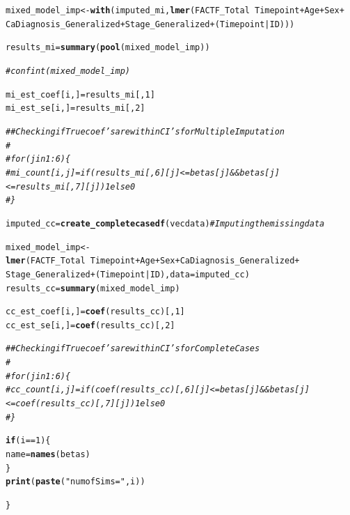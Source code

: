 \documentclass[fleqn,10pt]{wlscirep}\usepackage[]{graphicx}\usepackage[]{color}
\makeatletter
\newcommand{\hlnum}[1]{\textcolor[rgb]{0.686,0.059,0.569}{#1}}%
\newcommand{\hlstr}[1]{\textcolor[rgb]{0.192,0.494,0.8}{#1}}%
\newcommand{\hlcom}[1]{\textcolor[rgb]{0.678,0.584,0.686}{\textit{#1}}}%
\newcommand{\hlopt}[1]{\textcolor[rgb]{0,0,0}{#1}}%
\newcommand{\hlstd}[1]{\textcolor[rgb]{0.345,0.345,0.345}{#1}}%
\newcommand{\hlkwa}[1]{\textcolor[rgb]{0.161,0.373,0.58}{\textbf{#1}}}%
\newcommand{\hlkwb}[1]{\textcolor[rgb]{0.69,0.353,0.396}{#1}}%
\newcommand{\hlkwc}[1]{\textcolor[rgb]{0.333,0.667,0.333}{#1}}%
\newcommand{\hlkwd}[1]{\textcolor[rgb]{0.737,0.353,0.396}{\textbf{#1}}}%
\newenvironment{kframe}{%
 \def\at@end@of@kframe{}%
 \ifinner\ifhmode%
  \def\at@end@of@kframe{\end{minipage}}%
  \begin{minipage}{\columnwidth}%
 \fi\fi%
 \def\FrameCommand##1{\hskip\@totalleftmargin \hskip-\fboxsep
 \colorbox{shadecolor}{##1}\hskip-\fboxsep
     \hskip-\linewidth \hskip-\@totalleftmargin \hskip\columnwidth}%
 \MakeFramed {\advance\hsize-\width
   \@totalleftmargin\z@ \linewidth\hsize
   \@setminipage}}%
 {\par\unskip\endMakeFramed%
 \at@end@of@kframe}
\newenvironment{knitrout}{}{} %
\makeatother
\begin{document}
\begin{knitrout}
\begin{kframe}
\begin{alltt}
    \hlstd{mixed_model_imp} \hlkwb{<-} \hlkwd{with}\hlstd{(imputed_mi,}\hlkwd{lmer}\hlstd{(FACTF_Total} \hlopt{~} \hlstd{Timepoint} \hlopt{+} \hlstd{Age} \hlopt{+} \hlstd{Sex} \hlopt{+}
                            \hlstd{CaDiagnosis_Generalized} \hlopt{+} \hlstd{Stage_Generalized} \hlopt{+} \hlstd{(Timepoint}\hlopt{|}\hlstd{ID)))}

    \hlstd{results_mi} \hlkwb{=} \hlkwd{summary}\hlstd{(}\hlkwd{pool}\hlstd{(mixed_model_imp))}

    \hlcom{# confint(mixed_model_imp)}

    \hlstd{mi_est_coef[i,]} \hlkwb{=} \hlstd{results_mi[,} \hlnum{1} \hlstd{]}
    \hlstd{mi_est_se[i, ]} \hlkwb{=} \hlstd{results_mi[,} \hlnum{2} \hlstd{]}

\hlcom{#     # Checking if True coef's are within CI's for Multiple Imputation}
\hlcom{#     }
\hlcom{#     for (j in 1:6)\{}
\hlcom{#       mi_count[i,j] = if (results_mi[,6][j] <= betas[j] && betas[j] <= results_mi[, 7][j]) 1 else 0}
\hlcom{#     \}}

    \hlstd{imputed_cc} \hlkwb{=} \hlkwd{create_completecasedf}\hlstd{(vecdata)} \hlcom{# Imputing the missing data}

    \hlstd{mixed_model_imp} \hlkwb{<-} \hlkwd{lmer}\hlstd{(FACTF_Total} \hlopt{~} \hlstd{Timepoint} \hlopt{+} \hlstd{Age} \hlopt{+} \hlstd{Sex} \hlopt{+} \hlstd{CaDiagnosis_Generalized} \hlopt{+}
                              \hlstd{Stage_Generalized} \hlopt{+} \hlstd{(Timepoint}\hlopt{|}\hlstd{ID),} \hlkwc{data} \hlstd{= imputed_cc)}
    \hlstd{results_cc} \hlkwb{=} \hlkwd{summary}\hlstd{(mixed_model_imp)}

    \hlstd{cc_est_coef[i,]} \hlkwb{=} \hlkwd{coef}\hlstd{(results_cc)[,}\hlnum{1}\hlstd{]}
    \hlstd{cc_est_se[i, ]} \hlkwb{=} \hlkwd{coef}\hlstd{(results_cc)[,}\hlnum{2}\hlstd{]}

\hlcom{#     # Checking if True coef's are within CI's for Complete Cases }
\hlcom{#     }
\hlcom{#     for (j in 1:6)\{}
\hlcom{#       cc_count[i,j] = if (coef(results_cc)[, 6][j] <= betas[j] && betas[j] <= coef(results_cc)[, 7][j]) 1 else 0}
\hlcom{#     \}}

    \hlkwa{if} \hlstd{(i}\hlopt{==}\hlnum{1}\hlstd{)\{}
      \hlstd{name} \hlkwb{=} \hlkwd{names}\hlstd{(betas)}
    \hlstd{\}}
    \hlkwd{print}\hlstd{(}\hlkwd{paste}\hlstd{(}\hlstr{"num of Sims = "}\hlstd{, i))}

  \hlstd{\}}


\end{alltt}
\end{kframe}
\end{knitrout}
\end{document}
